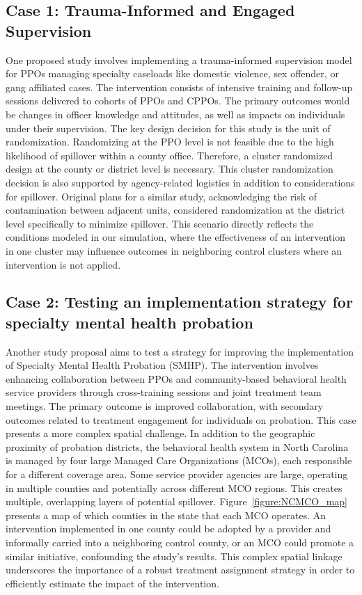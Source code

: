 \documentclass{article}[11pt]
\begin{document}
\subsection{Case 1: Trauma-Informed and Engaged Supervision}

One proposed study involves implementing a trauma-informed supervision model for PPOs managing specialty caseloads like domestic violence, sex offender, or gang affiliated cases. The intervention consists of intensive training and follow-up sessions delivered to cohorts of PPOs and CPPOs. The primary outcomes would be changes in officer knowledge and attitudes, as well as impacts on individuals under their supervision. The key design decision for this study is the unit of randomization. Randomizing at the PPO level is not feasible due to the high likelihood of spillover within a county office. Therefore, a cluster randomized design at the county or district level is necessary. This cluster randomization decision is also supported by agency-related logistics in addition to considerations for spillover. Original plans for a similar study, acknowledging the risk of contamination between adjacent units, considered randomization at the district level specifically to minimize spillover. This scenario directly reflects the conditions modeled in our simulation, where the effectiveness of an intervention in one cluster may influence outcomes in neighboring control clusters where an intervention is not applied.

\subsection{Case 2: Testing an implementation strategy for specialty mental health probation}

Another study proposal aims to test a strategy for improving the implementation of Specialty Mental Health Probation (SMHP). The intervention involves enhancing collaboration between PPOs and community-based behavioral health service providers through cross-training sessions and joint treatment team meetings. The primary outcome is improved collaboration, with secondary outcomes related to treatment engagement for individuals on probation. This case presents a more complex spatial challenge. In addition to the geographic proximity of probation districts, the behavioral health system in North Carolina is managed by four large Managed Care Organizations (MCOs), each responsible for a different coverage area. Some service provider agencies are large, operating in multiple counties and potentially across different MCO regions. This creates multiple, overlapping layers of potential spillover. Figure~\ref{figure:NCMCO_map} presents a map of which counties in the state that each MCO operates. An intervention implemented in one county could be adopted by a provider and informally carried into a neighboring control county, or an MCO could promote a similar initiative, confounding the study's results. This complex spatial linkage underscores the importance of a robust treatment assignment strategy in order to efficiently estimate the impact of the intervention.
\end{document}
